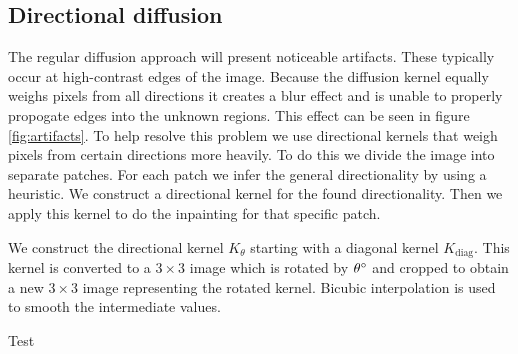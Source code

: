 \subsection{Directional diffusion}

The regular diffusion approach will present noticeable artifacts. These typically occur at high-contrast edges of the image. Because the diffusion kernel equally weighs pixels from all directions it creates a blur effect and is unable to properly propogate edges into the unknown regions. This effect can be seen in figure \ref{fig:artifacts}. To help resolve this problem we use directional kernels that weigh pixels from certain directions more heavily. To do this we divide the image into separate patches. For each patch we infer the general directionality by using a heuristic. We construct a directional kernel for the found directionality. Then we apply this kernel to do the inpainting for that specific patch.

We construct the directional kernel $K_\theta$ starting with a diagonal kernel $K_{\text{diag}}$. This kernel is converted to a $3\times 3$ image which is rotated by $\theta\degree$ and cropped to obtain a new $3\times 3$ image representing the rotated kernel. Bicubic interpolation is used to smooth the intermediate values.

Test


